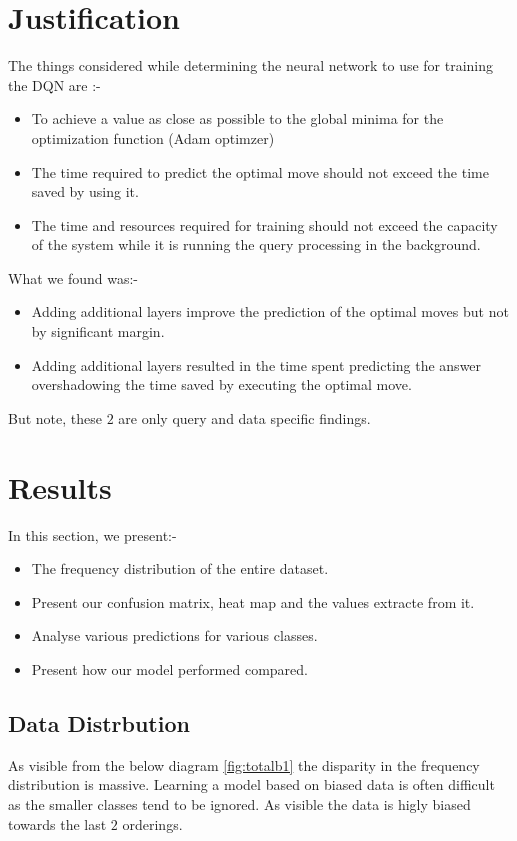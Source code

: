 \section{Justification}
The things considered while determining the neural network to use for training the DQN are :-
\begin{itemize}
    \item To achieve a value as close as possible to the global minima for the optimization function (Adam optimzer)
    \item The time required to predict the optimal move should not exceed the time saved by using it.
    \item The time and resources required for training should not exceed the capacity of the system while it is running the query processing in the background. 
\end{itemize}
What we found was:-
\begin{itemize}
    \item Adding additional layers improve the prediction of the optimal moves but not by significant margin.
    \item Adding additional layers resulted in the time spent predicting the answer overshadowing the time saved by executing the optimal move.
\end{itemize}
\par But note, these $2$ are only query and data specific findings.

\section{Results}
In this section, we present:-
\begin{itemize}
    \item The frequency distribution of the entire dataset.
    \item Present our confusion matrix, heat map and the values extracte from it.
    \item Analyse various predictions for various classes.
    \item Present how our model performed compared.
\end{itemize}


\subsection{Data Distrbution}
As visible from the below diagram \ref{fig:totalb1} the disparity in the frequency distribution is massive. Learning a model based on biased data is often difficult as the smaller classes tend to be ignored. As visible the data is higly biased towards the last $2$ orderings.\\

